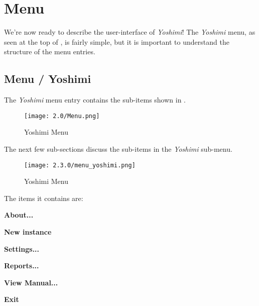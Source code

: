 %
%
%

\section{Menu}
\label{sec:menu}

   We're now ready to describe the user-interface of \textsl{Yoshimi}!
   The \textsl{Yoshimi} menu, as seen at the top of
   ,
   is fairly simple, but it is important to understand the
   structure of the menu entries.

\subsection{Menu / Yoshimi}
\label{subsec:menu_yoshimi}

   The \textsl{Yoshimi}
   menu entry contains the sub-items shown in
   .
   \begin{figure}[H]
   \centering
   \texttt{[image: 2.0/Menu.png]}
   \caption[Yoshimi Menu, Exit]{Yoshimi Menu}
   \label{fig:yoshimi_menu_items}
\end{figure}
   The next few sub-sections discuss the sub-items in the
   \textsl{Yoshimi} sub-menu.

\begin{figure}[H]
   \centering
   \texttt{[image: 2.3.0/menu\_yoshimi.png]}
   \caption[Yoshimi Menu, Exit]{Yoshimi Menu}
   \label{fig:yoshimi_view_yoshimi}
\end{figure}

   The items it contains are:

   \begin{enumber}
      \item \textbf{About...}
      \item \textbf{New instance}
      \item \textbf{Settings...}
      \item \textbf{Reports...}
      \item \textbf{View Manual...}
      \item \textbf{Exit}
   \end{enumber}

